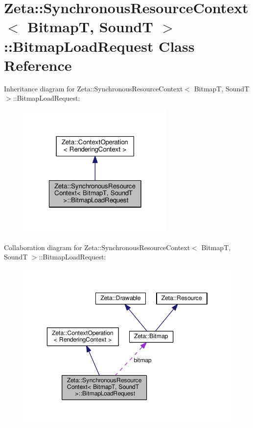 \hypertarget{classZeta_1_1SynchronousResourceContext_1_1BitmapLoadRequest}{\section{Zeta\+:\+:Synchronous\+Resource\+Context$<$ Bitmap\+T, Sound\+T $>$\+:\+:Bitmap\+Load\+Request Class Reference}
\label{classZeta_1_1SynchronousResourceContext_1_1BitmapLoadRequest}
}


Inheritance diagram for Zeta\+:\+:Synchronous\+Resource\+Context$<$ Bitmap\+T, Sound\+T $>$\+:\+:Bitmap\+Load\+Request\+:\nopagebreak
\begin{figure}[H]
\begin{center}
\leavevmode
\includegraphics[width=220pt]{classZeta_1_1SynchronousResourceContext_1_1BitmapLoadRequest__inherit__graph}
\end{center}
\end{figure}


Collaboration diagram for Zeta\+:\+:Synchronous\+Resource\+Context$<$ Bitmap\+T, Sound\+T $>$\+:\+:Bitmap\+Load\+Request\+:\nopagebreak
\begin{figure}[H]
\begin{center}
\leavevmode
\includegraphics[width=346pt]{classZeta_1_1SynchronousResourceContext_1_1BitmapLoadRequest__coll__graph}
\end{center}
\end{figure}
